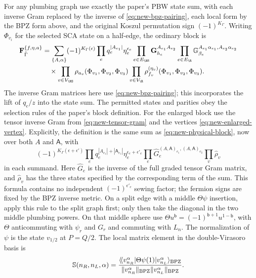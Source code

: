 For any plumbing graph use exactly the paper's PBW state sum, with
each inverse Gram replaced by the inverse of
\eqref{eq:new-bpz-pairing}, each local form by the BPZ form above,
and the original Koszul permutation sign $(-1)^{K_\Gamma}$.
Writing $\Phi_{v_i}$ for the selected SCA state on a half-edge,
the ordinary block is
\begin{align}
 \mathbf F_{\hat\Gamma}^{\{f,\eta,a\}}
 &=\sum_{\{A,\alpha\}}(-1)^{K_\Gamma(\epsilon)}
 \prod_e q_e^{|A_{e_1}|}\eta_e^{\epsilon_e}
 \prod_{e\in E_{\NS}}\mathbf G_{h_e}^{A_{e_1}A_{e_2}}
 \prod_{e\in E_{\R}}\mathbb G_{\beta_e}^{A_{e_1}\alpha_{e_1},A_{e_2}\alpha_{e_2}}\nonumber\\
 &\quad\times\prod_{v\in V_{\NS}}
       \rho_{a_v}(\Phi_{v_1},\Phi_{v_2},\Phi_{v_3})
 \prod_{v\in V_{\R}}\rho_{f_v}^{(\eta_v)}
       (\Phi_{v_1},\Phi_{v_2},\Phi_{v_3}).
 \label{eq:new-physical-block}
\end{align}
The inverse Gram matrices here use \eqref{eq:new-bpz-pairing};
this incorporates the lift of $q_e/z$ into the state sum.
The permitted states and parities obey the selection rules of the
paper's block definition.
For the enlarged block use the tensor inverse Gram from
\eqref{eq:new-tensor-gram} and the vertices
\eqref{eq:new-enlarged-vertex}.  Explicitly, the definition is the
same sum as \eqref{eq:new-physical-block}, now over both $A$ and
$\mathsf A$, with
\begin{equation}
 (-1)^{K_\Gamma(\epsilon+\epsilon')}
 \prod_e q_e^{|A_{e_1}|+|\mathsf A_{e_1}|}
            \eta_e^{\epsilon_e+\epsilon'_e}
 \prod_e\widehat G_e^{(A,\mathsf A)_{e_1},(A,\mathsf A)_{e_2}}
 \prod_v\widehat\rho_v
 \label{eq:new-enlarged-block}
\end{equation}
in each summand.  Here $\widehat G_e$ is the inverse of the full
graded tensor Gram matrix, and $\widehat\rho_v$ has the three states
specified by the corresponding term of the sum.  This formula
contains no independent $(-1)^{\epsilon'_e}$ sewing factor; the
fermion signs are fixed by the BPZ inverse metric.
On a split edge with a middle
$\Theta\psi$ insertion, apply this rule to the split graph first;
only then take the diagonal in the two middle plumbing powers.
On that middle sphere use
$\Theta u^{\mathsf b}=(-1)^{\mathsf b+1}u^{1-\mathsf b}$, with
$\Theta$ anticommuting with $\psi_r$ and $G_r$ and commuting with
$L_n$.  The normalization of $\psi$ is the state
$v_{1/2}$ at $P=Q/2$.  The local matrix element in the
double-Virasoro basis is
\begin{equation}
 \mathbb S(n_R,n_L,\alpha)
 =\frac{\langle\!\langle v_{n_R}^{\alpha}|\Theta\psi(1)
                |v_{n_L}^{\alpha}\rangle_{\rm BPZ}}
        {\|v_{n_R}^{\alpha}\|_{\rm BPZ}
         \|v_{n_L}^{\alpha}\|_{\rm BPZ}}.
 \label{eq:new-splitting}
\end{equation}
